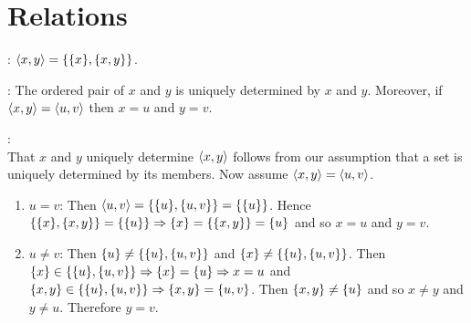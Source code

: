 \documentclass[12pt]{book}
\begin{document}
\section{Relations}
: $\langle x, y\rangle = \{\{x\}, \{x,y\}\}$.

: The ordered pair of $x$ and $y$ is uniquely determined by $x$ and $y$. Moreover, if $\langle x,y\rangle = \langle u,v\rangle$ then $x = u$ and $y = v$.

:\\
That $x$ and $y$ uniquely determine $\langle x,y\rangle$ follows from our assumption that a set is uniquely determined by its members. Now assume $\langle x,y\rangle = \langle u,v\rangle$. \begin{enumerate}[label=(Case \Roman*)]
\item $u=v$: Then $\langle u,v\rangle = \{\{u\}, \{u,v\}\} = \{\{u\}\}$. Hence $\{\{x\}, \{x,y\}\} = \{\{u\}\} \Rightarrow \{x\} = \{\{x,y\}\} = \{u\}$ and so $x=u$ and $y=v$. 
\item $u\neq v$: Then $\{u\} \neq \{\{u\}, \{u,v\}\}$ and $\{x\} \neq \{\{u\}, \{u,v\}\}$. Then $\{x\} \in  \{\{u\}, \{u,v\}\} \Rightarrow \{x\} = \{u\} \Rightarrow x = u$ and $\{x,y\} \in  \{\{u\}, \{u,v\}\} \Rightarrow \{x,y\} = \{u,v\}$. Then $\{x,y\} \neq \{u\}$ and so $x \neq y$ and $y \neq u$. Therefore $y = v$.
\end{enumerate}
\end{document}
